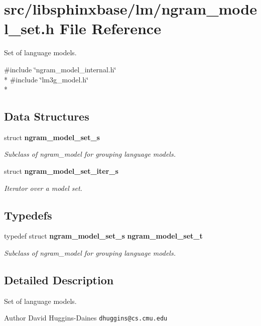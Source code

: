 \section{src/libsphinxbase/lm/ngram\+\_\+model\+\_\+set.h File Reference}
\label{ngram__model__set_8h}


Set of language models.  


{\ttfamily \#include \char`\"{}ngram\+\_\+model\+\_\+internal.\+h\char`\"{}}\\*
{\ttfamily \#include \char`\"{}lm3g\+\_\+model.\+h\char`\"{}}\\*
\subsection*{Data Structures}
\begin{DoxyCompactItemize}
\item 
struct {\bf ngram\+\_\+model\+\_\+set\+\_\+s}
\begin{DoxyCompactList}\small\item\em Subclass of ngram\+\_\+model for grouping language models. \end{DoxyCompactList}\item 
struct {\bf ngram\+\_\+model\+\_\+set\+\_\+iter\+\_\+s}
\begin{DoxyCompactList}\small\item\em Iterator over a model set. \end{DoxyCompactList}\end{DoxyCompactItemize}
\subsection*{Typedefs}
\begin{DoxyCompactItemize}
\item 
typedef struct {\bf ngram\+\_\+model\+\_\+set\+\_\+s} {\bf ngram\+\_\+model\+\_\+set\+\_\+t}\label{ngram__model__set_8h_af89b4060ed18e3f4e3ac0490a09d5745}

\begin{DoxyCompactList}\small\item\em Subclass of ngram\+\_\+model for grouping language models. \end{DoxyCompactList}\end{DoxyCompactItemize}


\subsection{Detailed Description}
Set of language models. 

\begin{DoxyAuthor}{Author}
David Huggins-\/\+Daines {\tt dhuggins@cs.\+cmu.\+edu} 
\end{DoxyAuthor}
